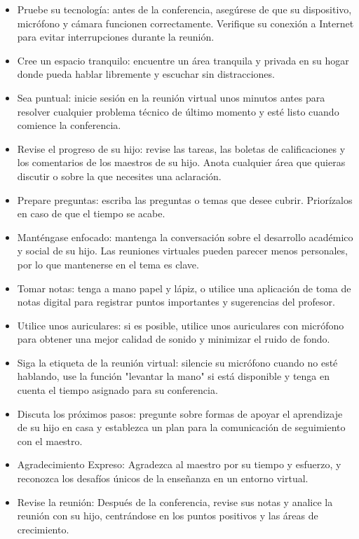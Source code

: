 \documentclass[12pt,letterpaper]{article}
\begin{document}
\begin{itemize}
\item Pruebe su tecnología: antes de la conferencia, asegúrese de que su dispositivo, micrófono y cámara funcionen correctamente. Verifique su conexión a Internet para evitar interrupciones durante la reunión.
\item Cree un espacio tranquilo: encuentre un área tranquila y privada en su hogar donde pueda hablar libremente y escuchar sin distracciones.
\item Sea puntual: inicie sesión en la reunión virtual unos minutos antes para resolver cualquier problema técnico de último momento y esté listo cuando comience la conferencia.
\item Revise el progreso de su hijo: revise las tareas, las boletas de calificaciones y los comentarios de los maestros de su hijo. Anota cualquier área que quieras discutir o sobre la que necesites una aclaración.
\item Prepare preguntas: escriba las preguntas o temas que desee cubrir. Priorízalos en caso de que el tiempo se acabe.
\item Manténgase enfocado: mantenga la conversación sobre el desarrollo académico y social de su hijo. Las reuniones virtuales pueden parecer menos personales, por lo que mantenerse en el tema es clave.
\pagebreak
\vspace*{.5in}
\item Tomar notas: tenga a mano papel y lápiz, o utilice una aplicación de toma de notas digital para registrar puntos importantes y sugerencias del profesor.
\item Utilice unos auriculares: si es posible, utilice unos auriculares con micrófono para obtener una mejor calidad de sonido y minimizar el ruido de fondo.
\item Siga la etiqueta de la reunión virtual: silencie su micrófono cuando no esté hablando, use la función "levantar la mano" si está disponible y tenga en cuenta el tiempo asignado para su conferencia.
\item Discuta los próximos pasos: pregunte sobre formas de apoyar el aprendizaje de su hijo en casa y establezca un plan para la comunicación de seguimiento con el maestro.
\item Agradecimiento Expreso: Agradezca al maestro por su tiempo y esfuerzo, y reconozca los desafíos únicos de la enseñanza en un entorno virtual.
\item Revise la reunión: Después de la conferencia, revise sus notas y analice la reunión con su hijo, centrándose en los puntos positivos y las áreas de crecimiento.
\end{itemize}
\end{document}
